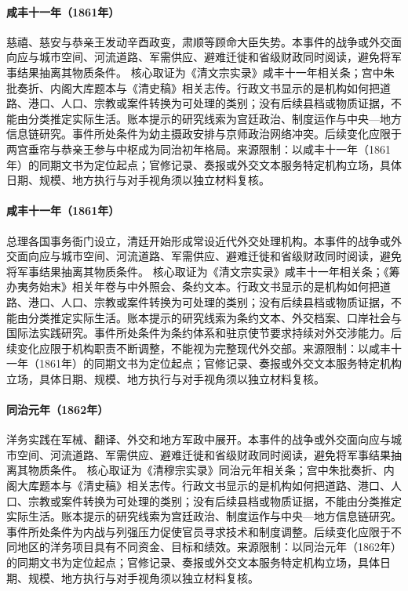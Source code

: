 \hypertarget{civic:EQ-1861-XINYOU-COUP}{}\paragraph{咸丰十一年（1861年）}慈禧、慈安与恭亲王发动辛酉政变，肃顺等顾命大臣失势。本事件的战争或外交面向应与城市空间、河流道路、军需供应、避难迁徙和省级财政同时阅读，避免将军事结果抽离其物质条件。 核心取证为《清文宗实录》咸丰十一年相关条；宫中朱批奏折、内阁大库题本与《清史稿》相关志传。行政文书显示的是机构如何把道路、港口、人口、宗教或案件转换为可处理的类别；没有后续县档或物质证据，不能由分类推定实际生活。账本提示的研究线索为宫廷政治、制度运作与中央—地方信息链研究。事件所处条件为幼主摄政安排与京师政治网络冲突。后续变化应限于两宫垂帘与恭亲王参与中枢成为同治初年格局。来源限制：以咸丰十一年（1861年）的同期文书为定位起点；官修记录、奏报或外交文本服务特定机构立场，具体日期、规模、地方执行与对手视角须以独立材料复核。
\hypertarget{civic:EQ-1861-ZONGLI-YAMEN}{}\paragraph{咸丰十一年（1861年）}总理各国事务衙门设立，清廷开始形成常设近代外交处理机构。本事件的战争或外交面向应与城市空间、河流道路、军需供应、避难迁徙和省级财政同时阅读，避免将军事结果抽离其物质条件。 核心取证为《清文宗实录》咸丰十一年相关条；《筹办夷务始末》相关年卷与中外照会、条约文本。行政文书显示的是机构如何把道路、港口、人口、宗教或案件转换为可处理的类别；没有后续县档或物质证据，不能由分类推定实际生活。账本提示的研究线索为条约文本、外交档案、口岸社会与国际法实践研究。事件所处条件为条约体系和驻京使节要求持续对外交涉能力。后续变化应限于机构职责不断调整，不能视为完整现代外交部。来源限制：以咸丰十一年（1861年）的同期文书为定位起点；官修记录、奏报或外交文本服务特定机构立场，具体日期、规模、地方执行与对手视角须以独立材料复核。
\hypertarget{civic:EQ-1862-SELF-STRENGTHENING-ORIGINS}{}\paragraph{同治元年（1862年）}洋务实践在军械、翻译、外交和地方军政中展开。本事件的战争或外交面向应与城市空间、河流道路、军需供应、避难迁徙和省级财政同时阅读，避免将军事结果抽离其物质条件。 核心取证为《清穆宗实录》同治元年相关条；宫中朱批奏折、内阁大库题本与《清史稿》相关志传。行政文书显示的是机构如何把道路、港口、人口、宗教或案件转换为可处理的类别；没有后续县档或物质证据，不能由分类推定实际生活。账本提示的研究线索为宫廷政治、制度运作与中央—地方信息链研究。事件所处条件为内战与列强压力促使官员寻求技术和制度调整。后续变化应限于不同地区的洋务项目具有不同资金、目标和绩效。来源限制：以同治元年（1862年）的同期文书为定位起点；官修记录、奏报或外交文本服务特定机构立场，具体日期、规模、地方执行与对手视角须以独立材料复核。
